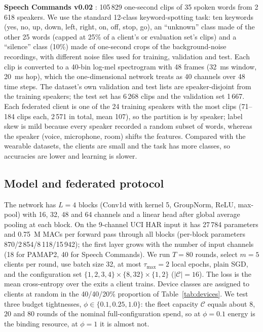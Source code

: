 \textbf{Speech Commands v0.02} \citep{warden2018speech}: 105\,829 one-second clips of 35 spoken words from 2\,618 speakers. We use the standard 12-class keyword-spotting task: ten keywords (yes, no, up, down, left, right, on, off, stop, go), an ``unknown'' class made of the other 25 words (capped at 25\% of a client's or evaluation set's clips) and a ``silence'' class (10\%) made of one-second crops of the background-noise recordings, with different noise files used for training, validation and test. Each clip is converted to a 40-bin log-mel spectrogram with 48 frames (32~ms window, 20~ms hop), which the one-dimensional network treats as 40 channels over 48 time steps. The dataset's own validation and test lists are speaker-disjoint from the training speakers; the test set has 6\,268 clips and the validation set 1\,667. Each federated client is one of the 24 training speakers with the most clips (71--184 clips each, 2\,571 in total, mean 107), so the partition is by speaker; label skew is mild because every speaker recorded a random subset of words, whereas the speaker (voice, microphone, room) shifts the features. Compared with the wearable datasets, the clients are small and the task has more classes, so accuracies are lower and learning is slower.

\subsection{Model and federated protocol}
The network has $L=4$ blocks (Conv1d with kernel 5, GroupNorm, ReLU, max-pool) with 16, 32, 48 and 64 channels and a linear head after global average pooling at each block. On the 9-channel UCI HAR input it has 27\,784 parameters and 0.75~M MACs per forward pass through all blocks (per-block parameters 870/2\,854/8\,118/15\,942); the first layer grows with the number of input channels (18 for PAMAP2, 40 for Speech Commands). We run $T=80$ rounds, select $m=5$ clients per round, use batch size 32, at most $\tau_{\max}=2$ local epochs, plain SGD, and the configuration set $\{1,2,3,4\}\times\{8,32\}\times\{1,2\}$ ($|\mathcal C|=16$). The loss is the mean cross-entropy over the exits a client trains. Device classes are assigned to clients at random in the 40/40/20\% proportion of Table~\ref{tab:devices}. We test three budget tightnesses, $\phi\in\{0.1,0.25,1.0\}$: the fleet capacity $\mathcal C$ equals about $8$, $20$ and $80$ rounds of the nominal full-configuration spend, so at $\phi=0.1$ energy is the binding resource, at $\phi=1$ it is almost not.

